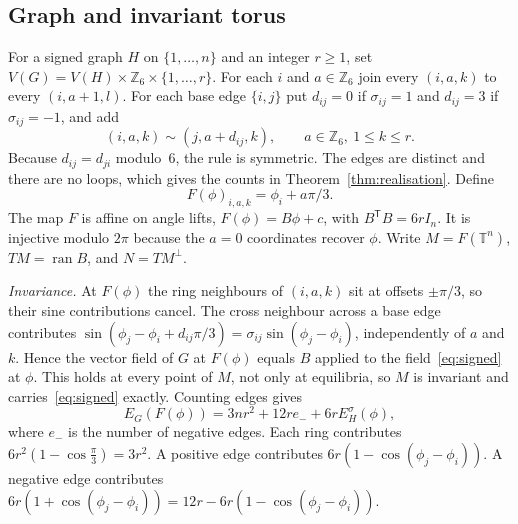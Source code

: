 \documentclass[11pt,a4paper]{article}
\theoremstyle{definition}\newtheorem{conjecture}{Conjecture}
\theoremstyle{remark}\newtheorem{remark}[theorem]{Remark}
\newcommand{\T}{\mathbb T}
\newcommand{\Z}{\mathbb Z}
\begin{document}
\subsection{Graph and invariant torus}
For a signed graph $H$ on $\{1,\dots,n\}$ and an integer $r\ge1$, set $V(G)=V(H)\times\Z_6\times\{1,\dots,r\}$. For each $i$ and $a\in\Z_6$ join every $(i,a,k)$ to every $(i,a+1,l)$. For each base edge $\{i,j\}$ put $d_{ij}=0$ if $\sigma_{ij}=1$ and $d_{ij}=3$ if $\sigma_{ij}=-1$, and add
\begin{equation}\label{eq:edges}
 (i,a,k)\sim(j,a+d_{ij},k),\qquad a\in\Z_6,\ 1\le k\le r.
\end{equation}
Because $d_{ij}=d_{ji}$ modulo~$6$, the rule is symmetric. The edges are distinct and there are no loops, which gives the counts in Theorem~\ref{thm:realisation}. Define
\begin{equation}\label{eq:embedding}
 F(\phi)_{i,a,k}=\phi_i+a\pi/3 .
\end{equation}
The map $F$ is affine on angle lifts, $F(\phi)=B\phi+c$, with $B^{\mathsf T}B=6rI_n$. It is injective modulo $2\pi$ because the $a=0$ coordinates recover $\phi$. Write $M=F(\T^n)$, $TM=\operatorname{ran}B$, and $N=TM^\perp$.

\emph{Invariance.} At $F(\phi)$ the ring neighbours of $(i,a,k)$ sit at offsets $\pm\pi/3$, so their sine contributions cancel. The cross neighbour across a base edge contributes $\sin(\phi_j-\phi_i+d_{ij}\pi/3)=\sigma_{ij}\sin(\phi_j-\phi_i)$, independently of $a$ and $k$. Hence the vector field of $G$ at $F(\phi)$ equals $B$ applied to the field~\eqref{eq:signed} at $\phi$. This holds at every point of $M$, not only at equilibria, so $M$ is invariant and carries~\eqref{eq:signed} exactly. Counting edges gives
\begin{equation}\label{eq:energyrestriction}
 E_G(F(\phi))=3nr^2+12re_-+6rE_H^\sigma(\phi),
\end{equation}
where $e_-$ is the number of negative edges. Each ring contributes $6r^2(1-\cos\frac\pi3)=3r^2$. A positive edge contributes $6r(1-\cos(\phi_j-\phi_i))$. A negative edge contributes $6r(1+\cos(\phi_j-\phi_i))=12r-6r(1-\cos(\phi_j-\phi_i))$.
\end{document}

